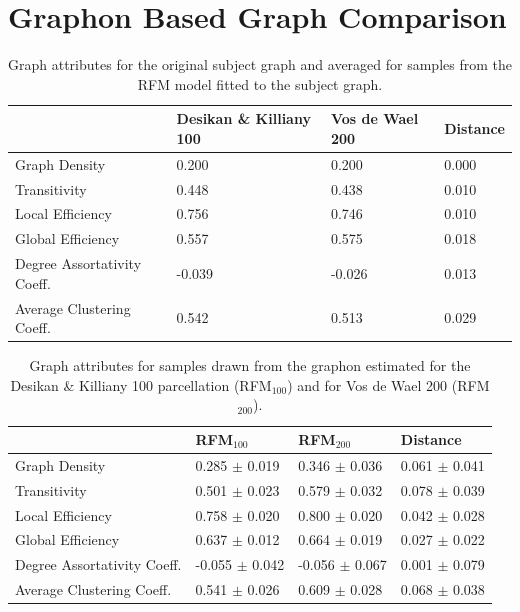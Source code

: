 \documentclass[11pt]{report} %
\begin{document}
\section{Graphon Based Graph Comparison}
\begin{table}[H]
\centering
\caption{Graph attributes for the original subject graph and averaged for samples from the RFM model fitted to the subject graph.}
\label{graphcomparison}
\begin{tabular}{|l|l|l|l|}
\hline
& \textbf{Desikan \& Killiany 100} & \textbf{Vos de Wael 200} & \textbf{Distance} \\ \hline
Graph Density                    & 0.200   & 0.200  & 0.000 \\ \hline
Transitivity                     & 0.448   & 0.438  & 0.010 \\ \hline
Local Efficiency                 & 0.756   & 0.746  & 0.010 \\ \hline
Global Efficiency                & 0.557   & 0.575  & 0.018 \\ \hline
Degree Assortativity Coeff. & -0.039  & -0.026 & 0.013 \\ \hline
Average Clustering Coeff.  & 0.542   & 0.513  & 0.029 \\ \hline
\end{tabular}
\end{table}
\begin{table}[H]
\centering
\caption{Graph attributes for samples drawn from the graphon estimated for the Desikan \& Killiany 100 parcellation (RFM$_{100}$) and for Vos de Wael 200 (RFM$_{200}$).} 
\label{samplecomparison}
\begin{tabular}{|l|l|l|l|}
\hline
& \textbf{RFM$_{100}$} & \textbf{RFM$_{200}$} & \textbf{Distance} \\ \hline
Graph Density               & 0.285  $\pm$ 0.019  & 0.346 $\pm$ 0.036   & 0.061 $\pm$ 0.041   \\ \hline
Transitivity                & 0.501  $\pm$ 0.023  & 0.579 $\pm$ 0.032   & 0.078 $\pm$ 0.039  \\ \hline
Local Efficiency            & 0.758  $\pm$ 0.020  & 0.800 $\pm$ 0.020   & 0.042 $\pm$ 0.028  \\ \hline
Global Efficiency           & 0.637  $\pm$ 0.012  & 0.664 $\pm$ 0.019   & 0.027 $\pm$ 0.022  \\ \hline
Degree Assortativity Coeff. & -0.055 $\pm$ 0.042  & -0.056 $\pm$ 0.067  & 0.001 $\pm$ 0.079  \\ \hline
Average Clustering Coeff.   & 0.541  $\pm$ 0.026  & 0.609 $\pm$ 0.028   & 0.068 $\pm$ 0.038  \\ \hline
\end{tabular}
\end{table}
\end{document}
